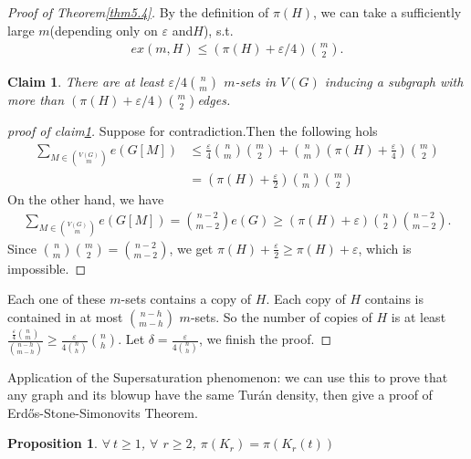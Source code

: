 \documentclass{article}
\newtheorem{claim}[theorem]{Claim}
\newtheorem{proposition}[theorem]{Proposition}
\theoremstyle{definition}
\def\Erdos{Erd\H{o}s}
\def\Turan{Tur\'an}
\renewcommand{\epsilon}{\varepsilon}
\begin{document}
 \begin{proof}[Proof of Theorem\ref{thm5.4}]
 By the definition of $\pi(H)$, we can take a sufficiently large $m$(depending only on $\epsilon$ and$H$), s.t.
 \begin{align*}
     ex(m,H)\leq(\pi(H)+\epsilon/4)\binom{m}{2}.
 \end{align*}
     \begin{claim}\label{claim5.1}
         There are at least $\epsilon/4\binom{n}{m}$ $m$-sets in $V(G)$ inducing a subgraph with more than $(\pi(H)+\epsilon/4)\binom{m}{2}$edges.
     \end{claim}
     \begin{proof}[proof of claim\ref{claim5.1}]
     Suppose for contradiction.Then the following hols
     \begin{align*}
             \sum_{M\in\binom{V(G)}{m}}e(G[M])
             &\leq \frac{\epsilon}{4}\binom{n}{m}\binom{m}{2}+\binom{n}{m}(\pi(H)+\frac{\epsilon}{4})\binom{m}{2}\\
             &=(\pi(H)+\frac{\epsilon}{2})\binom{n}{m}\binom{m}{2}
     \end{align*}
     On the other hand, we have
     \begin{align*}
          \sum_{M\in\binom{V(G)}{m}}e(G[M])=\binom{n-2}{m-2}e(G)\geq (\pi(H)+\epsilon)\binom{n}{2}\binom{n-2}{m-2}.
     \end{align*}
     Since $\binom{n}{m}\binom{m}{2}=\binom{n-2}{m-2}$, we get $\pi(H)+\frac{\epsilon}{2}\geq\pi(H)+\epsilon$, which is impossible.
     \end{proof}
     Each one of these $m$-sets contains a copy of $H$. Each copy of $H$ contains is contained in at most $\binom{n-h}{m-h}$ $m$-sets. So the number of copies of $H$ is at least $\frac{\frac{\epsilon}{4}\binom{n}{m}}{\binom{n-h}{m-h}}\geq \frac{\epsilon}{4\binom{n}{h}}\binom{n}{h}$. Let $\delta=\frac{\epsilon}{4\binom{n}{h}}$, we finish the proof.
 \end{proof}
Application of the Supersaturation phenomenon: we can use this to prove that any graph and its blowup have the same \Turan{} density, then give a proof of  \Erdos{}-Stone-Simonovits Theorem.

\begin{proposition}\label{prop5.6}
    $\forall\ t\geq 1$, $\forall$ $r\geq2$, $\pi(K_r)=\pi(K_r(t))$
\end{proposition}
\end{document}
